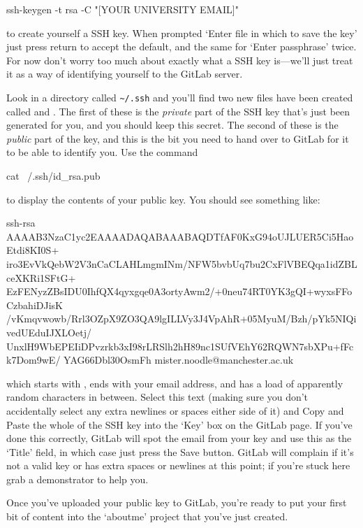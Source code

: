 \begin{ttoutenv}
ssh-keygen -t rsa -C "[YOUR UNIVERSITY EMAIL]"
\end{ttoutenv}

to create yourself a SSH key. When prompted `Enter file in which to save the key' just press return to accept the default, and the same for `Enter passphrase' twice.  For now don't worry too much about exactly what a SSH key is---we'll just treat it as a way of identifying yourself to the GitLab server. 

Look in a directory called \verb!~/.ssh! and you'll find two new files have been created called  and . The first of these is the \textit{private} part of the SSH key that's just been generated for you, and you should keep this secret. The second of these is the \textit{public} part of the key, and this is the bit you need to hand over to GitLab for it to be able to identify you. Use the command

\begin{ttoutenv}
cat ~/.ssh/id_rsa.pub
\end{ttoutenv}
to display the contents of your public key. You should see something like:

\begin{ttoutenv}
  
  ssh-rsa  AAAAB3NzaC1yc2EAAAADAQABAAABAQDTfAF0KxG94oUJLUER5Ci5HaoEtdi8KI0S+
  iro3EvVkQebW2V3nCaCLAHLmgmINm/NFW5bvbUq7bu2CxFlVBEQqa1idZBLceXKRi1SFtG+
  EzFENyzZBsIDU0IhfQX4qyxgqe0A3ortyAwm2/+0neu74RT0YK3gQI+wyxsFFoCzbahiDJisK
  /vKmqvwowb/Rrl3OZpX9ZO3QA9lgILLVy3J4VpAhR+05MyuM/Bzh/pYk5NIQivedUEduIJXLOetj/
  UnxlH9WbEPEIiDPvzrkb3xI98rLRSlh2hH89nc1SUfVEhY62RQWN7sbXPu+fFck7Dom9wE/
  YAG66Dbl30OsmFh mister.noodle@manchester.ac.uk

\end{ttoutenv}

which starts with , ends with your email address, and has a load of apparently random characters in between. Select this text (making sure you don't accidentally select any extra newlines or spaces either side of it) and 
Copy and Paste the whole of the SSH key into the `Key' box on the GitLab page. If you've done this correctly, GitLab will spot the email from your key and use this as the `Title' field, in which case just press the Save button. GitLab will complain if it's not a valid key or has extra spaces or newlines at this point; if you're stuck here grab a demonstrator to help you. 

Once you've uploaded your public key to GitLab, you're ready to put your first bit of content into the `aboutme' project that you've just created. 

